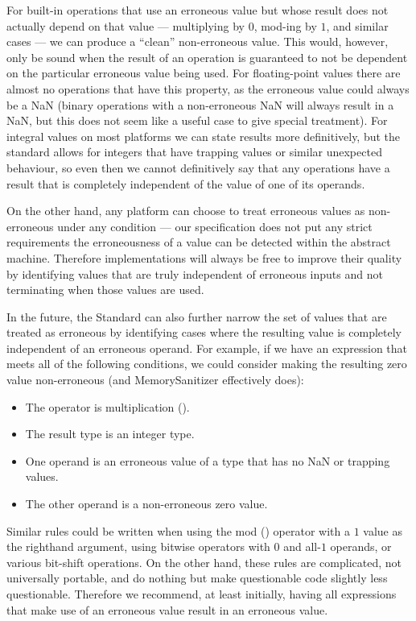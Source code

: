 For built-in operations that use an erroneous value but whose result does not actually depend on that value --- multiplying by $0$, mod-ing by $1$, and similar cases --- we can produce a ``clean'' non-erroneous value.  This would, however, only be sound when the result of an operation is guaranteed to not be dependent on the particular erroneous value being used.  For floating-point values there are almost no operations that have this property, as the erroneous value could always be a NaN (binary operations with a non-erroneous NaN will always result in a NaN, but this does not seem like a useful case to give special treatment).   For integral values on most platforms we can state results more definitively, but the standard allows for integers that have trapping values or similar unexpected behaviour, so even then we cannot definitively say that any operations have a result that is completely independent of the value of one of its operands.

On the other hand, any platform can choose to treat erroneous values as non-erroneous under any condition --- our specification does not put any strict requirements the  erroneousness of a value can be detected within the abstract machine.   Therefore implementations will always be free to improve their quality by identifying values that are truly independent of erroneous inputs and not terminating when those values are used.

In the future, the Standard can also further narrow the set of values that are treated as erroneous by identifying cases where the resulting value is completely independent of an erroneous operand.  For example, if we have an expression that meets all of the following conditions, we could consider making the resulting zero value non-erroneous (and MemorySanitizer effectively does):
\begin{itemize}
\item The operator is multiplication (\tcode{*}).
\item The result type is an integer type.
\item One operand is an erroneous value of a type that has no NaN or trapping values.
\item The other operand is a non-erroneous zero value.
\end{itemize}
Similar rules could be written when using the mod (\tcode{\%}) operator with a $1$ value as the righthand argument, using bitwise operators with $0$ and all-$1$ operands, or various bit-shift operations.   On the other hand, these rules are complicated, not universally portable, and do nothing but make questionable code slightly less questionable.   Therefore we recommend, at least initially, having all expressions that make use of an erroneous value result in an erroneous value.

